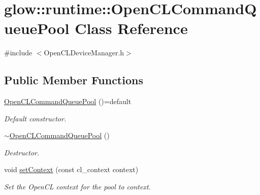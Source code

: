 \hypertarget{classglow_1_1runtime_1_1_open_c_l_command_queue_pool}{}\section{glow\+:\+:runtime\+:\+:Open\+C\+L\+Command\+Queue\+Pool Class Reference}
\label{classglow_1_1runtime_1_1_open_c_l_command_queue_pool}


{\ttfamily \#include $<$Open\+C\+L\+Device\+Manager.\+h$>$}

\subsection*{Public Member Functions}
\begin{DoxyCompactItemize}
\item 
\mbox{\label{classglow_1_1runtime_1_1_open_c_l_command_queue_pool_a7756db863fae18ddfa60d93385c14c9c}} 
\hyperlink{classglow_1_1runtime_1_1_open_c_l_command_queue_pool_a7756db863fae18ddfa60d93385c14c9c}{Open\+C\+L\+Command\+Queue\+Pool} ()=default
\begin{DoxyCompactList}\small\item\em Default constructor. \end{DoxyCompactList}\item 
\mbox{\label{classglow_1_1runtime_1_1_open_c_l_command_queue_pool_a9c09b49d821c59938bb9c1eafcdb2d15}} 
\hyperlink{classglow_1_1runtime_1_1_open_c_l_command_queue_pool_a9c09b49d821c59938bb9c1eafcdb2d15}{$\sim$\+Open\+C\+L\+Command\+Queue\+Pool} ()
\begin{DoxyCompactList}\small\item\em Destructor. \end{DoxyCompactList}\item 
\mbox{\label{classglow_1_1runtime_1_1_open_c_l_command_queue_pool_a5548dd592b22f1cb8545a7db1e00ac15}} 
void \hyperlink{classglow_1_1runtime_1_1_open_c_l_command_queue_pool_a5548dd592b22f1cb8545a7db1e00ac15}{set\+Context} (const cl\+\_\+context context)
\begin{DoxyCompactList}\small\item\em Set the Open\+CL context for the pool to {\ttfamily context}. \end{DoxyCompactList}\item 

\end{DoxyCompactItemize}
